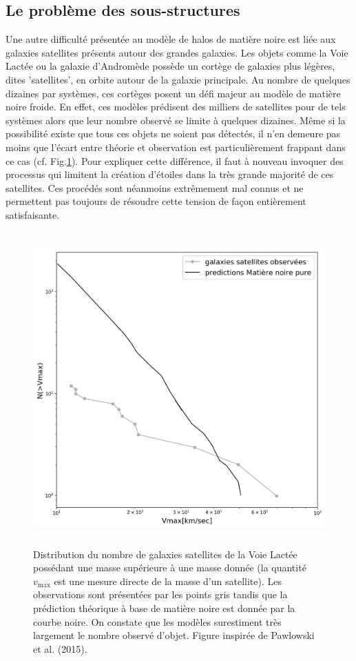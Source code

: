 \subsection{Le problème des sous-structures}
Une autre difficulté présentée au modèle de halos de matière noire est liée aux galaxies satellites présents autour des grandes galaxies. Les objets comme la Voie Lactée ou la galaxie d'Andromède possède un cortège de galaxies plus légères, dites 'satellites', en orbite autour de la galaxie principale. Au nombre de quelques dizaines par systèmes, ces cortèges posent un défi majeur au modèle de matière noire froide. En effet, ces modèles  prédisent des milliers de satellites pour de tels systèmes alors que leur nombre observé se limite à quelques dizaines. Même si la possibilité existe que tous ces objets ne soient pas détectés, il n'en demeure pas moins que l'écart entre théorie et observation est particulièrement frappant dans ce cas (cf. Fig.\ref{f:missing}). Pour expliquer cette différence, il faut à nouveau invoquer des processus qui limitent la création d'étoiles dans la très grande majorité de ces satellites. Ces procédés sont néanmoins extrêmement mal connus et ne permettent pas toujours de résoudre cette tension de façon entièrement satisfaisante.
\begin{figure}[htbp]
	\centering
		\includegraphics[height=12cm]{figs/missing.png}
	\caption[Distribution du nombre de galaxies satellites de la Voie Lactée]{Distribution du nombre de galaxies satellites de la Voie Lactée possédant une masse supérieure à une masse donnée (la quantité $v_\mathrm{max}$ est une mesure directe de la masse d'un satellite). Les observations sont présentées par les points gris tandis que la prédiction théorique à base de matière noire est donnée par la courbe noire. On constate que les modèles surestiment très largement le nombre observé d'objet. Figure inspirée de Pawlowski et al. (2015). } 
	\label{f:missing}
\end{figure}

